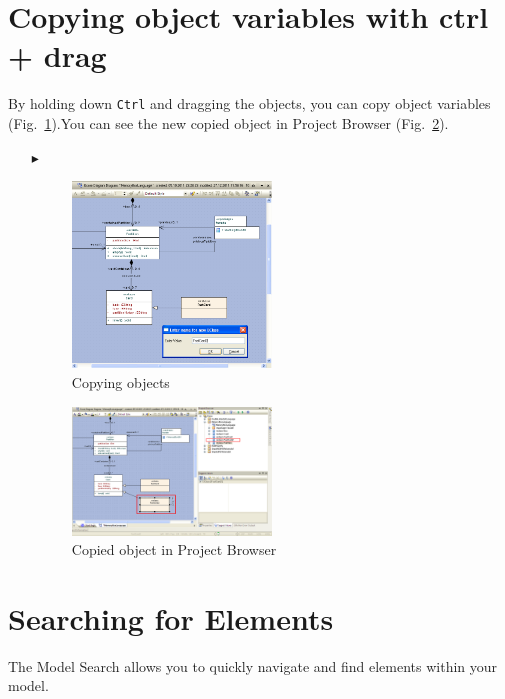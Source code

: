 \section{Copying object variables with ctrl + drag}
By holding down \texttt{Ctrl} and dragging the objects, you can copy object
variables (Fig.~\ref{fig_copy01}).You can see the new copied object in Project
Browser (Fig.~\ref{fig_copy02}).

\begin{enumerate}
\item[$\blacktriangleright$]
\begin{figure}[htbp]
\begin{center}
  \includegraphics[width=0.5\textwidth]{pics/tricks/copy/copy1}
  \caption{Copying objects}  
  \label{fig_copy01}
\end{center}
\end{figure}


\begin{figure}[htbp]
\begin{center}
  \includegraphics[width=0.5\textwidth]{pics/tricks/copy/copy2}
  \caption{Copied object in Project Browser}  
 
  \label{fig_copy02}
\end{center}
\end{figure}

\end{enumerate}


\section{Searching for Elements}
The Model Search allows you to quickly navigate and find elements within your
model.


